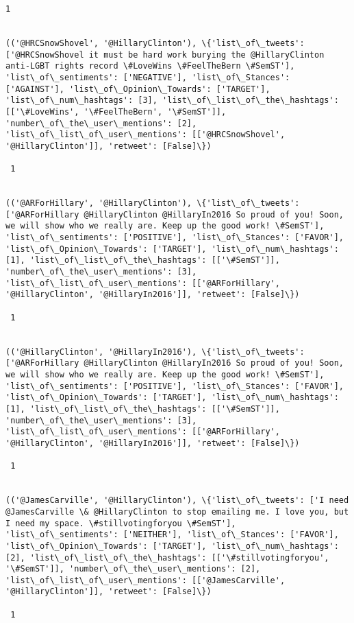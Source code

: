 \documentclass[11pt]{article}
\begin{document}
\begin{Verbatim}[commandchars=\\\{\}]
 1
 

(('@HRCSnowShovel', '@HillaryClinton'), \{'list\_of\_tweets': ['@HRCSnowShovel it must be hard work burying the @HillaryClinton anti-LGBT rights record \#LoveWins \#FeelTheBern \#SemST'], 'list\_of\_sentiments': ['NEGATIVE'], 'list\_of\_Stances': ['AGAINST'], 'list\_of\_Opinion\_Towards': ['TARGET'], 'list\_of\_num\_hashtags': [3], 'list\_of\_list\_of\_the\_hashtags': [['\#LoveWins', '\#FeelTheBern', '\#SemST']], 'number\_of\_the\_user\_mentions': [2], 'list\_of\_list\_of\_user\_mentions': [['@HRCSnowShovel', '@HillaryClinton']], 'retweet': [False]\})

 1
 

(('@ARForHillary', '@HillaryClinton'), \{'list\_of\_tweets': ['@ARForHillary @HillaryClinton @HillaryIn2016 So proud of you! Soon, we will show who we really are. Keep up the good work! \#SemST'], 'list\_of\_sentiments': ['POSITIVE'], 'list\_of\_Stances': ['FAVOR'], 'list\_of\_Opinion\_Towards': ['TARGET'], 'list\_of\_num\_hashtags': [1], 'list\_of\_list\_of\_the\_hashtags': [['\#SemST']], 'number\_of\_the\_user\_mentions': [3], 'list\_of\_list\_of\_user\_mentions': [['@ARForHillary', '@HillaryClinton', '@HillaryIn2016']], 'retweet': [False]\})

 1
 

(('@HillaryClinton', '@HillaryIn2016'), \{'list\_of\_tweets': ['@ARForHillary @HillaryClinton @HillaryIn2016 So proud of you! Soon, we will show who we really are. Keep up the good work! \#SemST'], 'list\_of\_sentiments': ['POSITIVE'], 'list\_of\_Stances': ['FAVOR'], 'list\_of\_Opinion\_Towards': ['TARGET'], 'list\_of\_num\_hashtags': [1], 'list\_of\_list\_of\_the\_hashtags': [['\#SemST']], 'number\_of\_the\_user\_mentions': [3], 'list\_of\_list\_of\_user\_mentions': [['@ARForHillary', '@HillaryClinton', '@HillaryIn2016']], 'retweet': [False]\})

 1
 

(('@JamesCarville', '@HillaryClinton'), \{'list\_of\_tweets': ['I need @JamesCarville \& @HillaryClinton to stop emailing me. I love you, but I need my space. \#stillvotingforyou \#SemST'], 'list\_of\_sentiments': ['NEITHER'], 'list\_of\_Stances': ['FAVOR'], 'list\_of\_Opinion\_Towards': ['TARGET'], 'list\_of\_num\_hashtags': [2], 'list\_of\_list\_of\_the\_hashtags': [['\#stillvotingforyou', '\#SemST']], 'number\_of\_the\_user\_mentions': [2], 'list\_of\_list\_of\_user\_mentions': [['@JamesCarville', '@HillaryClinton']], 'retweet': [False]\})

 1
 


\end{Verbatim}
\end{document}
